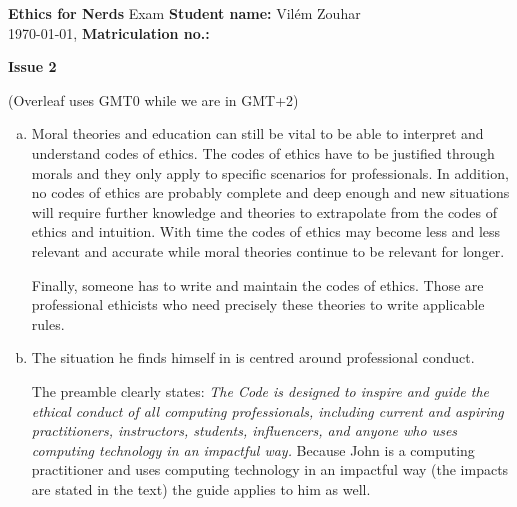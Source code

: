 \documentclass[a4paper, 11pt]{article}
\newcommand{\stdn}{} \newcommand{\studentname}[1]{\renewcommand{\stdn}{#1}}
\newcommand{\mtrk}{} \newcommand{\matriculationno}[1]{\renewcommand{\mtrk}{#1}}
\newcommand{\isnr}{} \newcommand{\issuenumber}[1]{\renewcommand{\isnr}{#1}}
\newcommand{\makeheader}{\textbf{Ethics for Nerds} Exam \hfill \textbf{Student name:} \stdn \\ \today, \currenttime \hfill \textbf{Matriculation no.:} \mtrk \par \textbf{\Large Issue \isnr}}
\begin{document}
\sffamily


\studentname{Vilém Zouhar} %
\matriculationno{} %
\issuenumber{2} %
\makeheader %


(Overleaf uses GMT0 while we are in GMT+2)

\begin{enumerate}[(a)]
	\item
	Moral theories and education can still be vital to be able to interpret and understand codes of ethics.
    The codes of ethics have to be justified through morals and they only apply to specific scenarios for professionals.
    In addition, no codes of ethics are probably complete and deep enough and new situations will require further knowledge and theories to extrapolate from the codes of ethics and intuition.
    With time the codes of ethics may become less and less relevant and accurate while moral theories continue to be relevant for longer.
    
    Finally, someone has to write and maintain the codes of ethics.
    Those are professional ethicists who need precisely these theories to write applicable rules.
    
    \item
    The situation he finds himself in is centred around professional conduct.
    
    The preamble clearly states:
    \emph{The Code is designed to inspire and guide the ethical conduct of all computing professionals, including current and aspiring practitioners, instructors, students, influencers, and anyone who uses computing technology in an impactful way.}
    Because John is a computing practitioner and uses computing technology in an impactful way (the impacts are stated in the text) the guide applies to him as well.
    

\end{enumerate}
\end{document}
